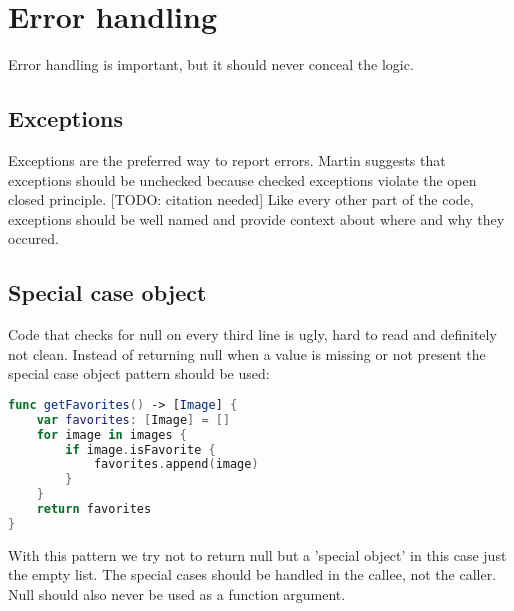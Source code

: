\section{Error handling}
Error handling is important, but it should never conceal the logic.

\subsection{Exceptions}
Exceptions are the preferred way to report errors. Martin suggests that exceptions should be unchecked because checked exceptions violate the open closed principle. [TODO: citation needed]
Like every other part of the code, exceptions should be well named and provide context about where and why they occured.

\subsection{Special case object}
Code that checks for null on every third line is ugly, hard to read and definitely not clean. Instead of returning null when a value is missing or not present the special case object pattern should be used:

\begin{lstlisting}[language=Swift, caption={Function that uses the special case object pattern}]
func getFavorites() -> [Image] {
    var favorites: [Image] = []
    for image in images {
        if image.isFavorite {
            favorites.append(image)
        }
    }
    return favorites
}
\end{lstlisting}

With this pattern we try not to return null but a 'special object' in this case just the empty list. The special cases should be handled in the callee, not the caller. Null should also never be used as a function argument.

